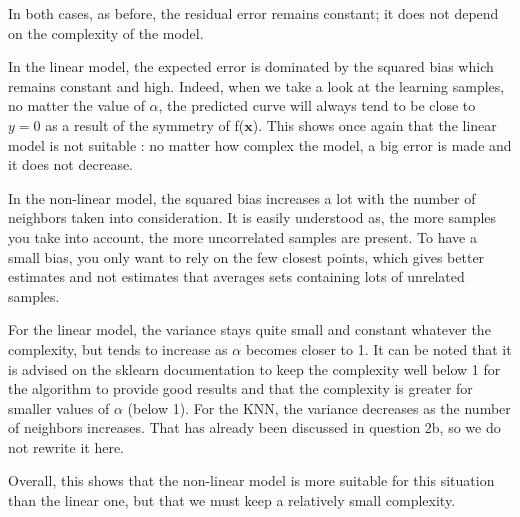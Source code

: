 In both cases, as before, the residual error remains constant; it does not depend on the complexity of the model.\par
In the linear model, the expected error is dominated by the squared bias which remains constant and high. Indeed, when we take a look at the learning samples, no matter the value of $\alpha$, the predicted curve will always tend to be close to $y = 0$ as a result of the symmetry of f($\mathbf{x}$). This shows once again that the linear model is not suitable : no matter how complex the model, a big error is made and it does not decrease.\par
In the non-linear model, the squared bias increases a lot with the number of neighbors taken into consideration. It is easily understood as, the more samples you take into account, the more uncorrelated samples are present. To have a small bias, you only want to rely on the few closest points, which gives better estimates and not estimates that averages sets containing lots of unrelated samples.\par
For the linear model, the variance stays quite small and constant whatever the complexity, but tends to increase as $\alpha$ becomes closer to 1. It can be noted that it is advised on the sklearn documentation to keep the complexity well below 1 for the algorithm to provide good results and that the complexity is greater for smaller values of $\alpha$ (below 1). For the KNN, the variance decreases as the number of neighbors increases. That has already been discussed in question 2b, so we do not rewrite it here.\par
Overall, this shows that the non-linear model is more suitable for this situation than the linear one, but that we must keep a relatively small complexity.

